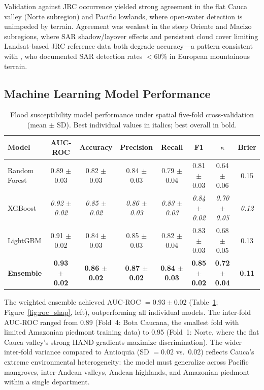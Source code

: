\documentclass{article}
\begin{document}
Validation against JRC occurrence yielded strong agreement in the flat Cauca valley (Norte subregion) and Pacific lowlands, where open-water detection is unimpeded by terrain. Agreement was weakest in the steep Oriente and Macizo subregions, where SAR shadow/layover effects and persistent cloud cover limiting Landsat-based JRC reference data both degrade accuracy---a pattern consistent with \citet{Tarpanelli2022}, who documented SAR detection rates $<$60\% in European mountainous terrain.

\subsection{Machine Learning Model Performance}

\begin{table}[htbp]
\caption{Flood susceptibility model performance under spatial five-fold cross-validation (mean $\pm$ SD). Best individual values in italics; best overall in bold.}
\label{tab:ml_results}
\centering
\footnotesize
\begin{tabular}{lccccccc}
\toprule
\textbf{Model} & \textbf{AUC-ROC} & \textbf{Accuracy} & \textbf{Precision} & \textbf{Recall} & \textbf{F1} & \textbf{$\kappa$} & \textbf{Brier} \\
\midrule
Random Forest   & 0.89 $\pm$ 0.03 & 0.82 $\pm$ 0.03 & 0.84 $\pm$ 0.03 & 0.79 $\pm$ 0.04 & 0.81 $\pm$ 0.03 & 0.64 $\pm$ 0.06 & 0.15 \\
XGBoost         & \textit{0.92 $\pm$ 0.02} & \textit{0.85 $\pm$ 0.02} & \textit{0.86 $\pm$ 0.03} & \textit{0.83 $\pm$ 0.03} & \textit{0.84 $\pm$ 0.02} & \textit{0.70 $\pm$ 0.05} & \textit{0.12} \\
LightGBM        & 0.91 $\pm$ 0.02 & 0.84 $\pm$ 0.03 & 0.85 $\pm$ 0.03 & 0.82 $\pm$ 0.04 & 0.83 $\pm$ 0.03 & 0.68 $\pm$ 0.05 & 0.13 \\
\textbf{Ensemble} & \textbf{0.93 $\pm$ 0.02} & \textbf{0.86 $\pm$ 0.02} & \textbf{0.87 $\pm$ 0.02} & \textbf{0.84 $\pm$ 0.03} & \textbf{0.85 $\pm$ 0.02} & \textbf{0.72 $\pm$ 0.04} & \textbf{0.11} \\
\bottomrule
\end{tabular}
\end{table}

The weighted ensemble achieved AUC-ROC $= 0.93 \pm 0.02$ (Table~\ref{tab:ml_results}; Figure~\ref{fig:roc_shap}, left), outperforming all individual models. The inter-fold AUC-ROC ranged from 0.89 (Fold~4: Bota Caucana, the smallest fold with limited Amazonian piedmont training data) to 0.95 (Fold~1: Norte, where the flat Cauca valley's strong HAND gradients maximize discrimination). The wider inter-fold variance compared to Antioquia (SD $= 0.02$ vs.\ 0.02) reflects Cauca's extreme environmental heterogeneity: the model must generalize across Pacific mangroves, inter-Andean valleys, Andean highlands, and Amazonian piedmont within a single department.
\end{document}
